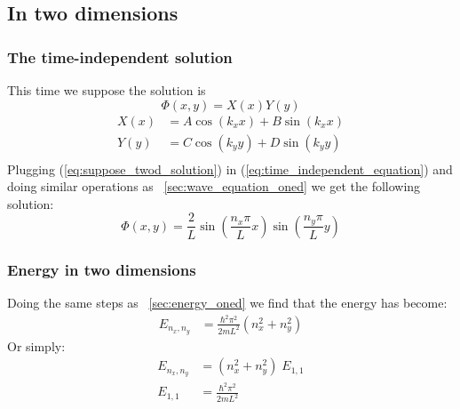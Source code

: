 \documentclass[a4paper, 10pt]{article}
\begin{document}
    \subsection{In two dimensions}
        \subsubsection{The time-independent solution}
        This time we suppose the solution is
        \begin{equation} \label{eq:suppose_twod_solution}
            \Phi(x, y) = X(x)Y(y)
        \end{equation}
        \begin{align*}
            X(x) &= A\cos(k_x x) + B \sin(k_x x) \\
            Y(y) &= C\cos(k_y y) + D \sin(k_y y) \\
        \end{align*}
        Plugging (\ref{eq:suppose_twod_solution}) in (\ref{eq:time_independent_equation})
        and doing similar operations as ~\ref{sec:wave_equation_oned} we get
        the following solution:
        \begin{equation} \label{eq:twod_solution}
            \Phi(x, y) = \frac{2}{L} \sin\left( \frac{n_x\pi}{L}x\right)
                         \sin\left( \frac{n_y\pi}{L} y\right)
        \end{equation}

        \subsubsection{Energy in two dimensions}
        Doing the same steps as ~\ref{sec:energy_oned} we find that the energy has
        become:
        \begin{align}
            E_{n_x, n_y} &= \frac{\hbar^2 \pi^2}{2mL^2} (n^2_x + n^2_y)
        \end{align}
        Or simply:
        \begin{align*}
        E_{n_x, n_y} &= (n^2_x + n^2_y) \; E_{1,1} \\
        E_{1,1} &= \frac{\hbar^2 \pi^2}{2mL^2} 
        \end{align*}
\end{document}
